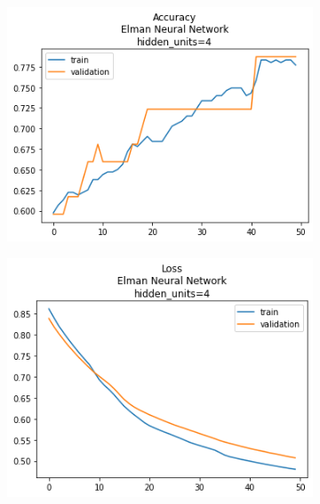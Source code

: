 \documentclass[12pt, a4paper]{article}
\begin{document}
\begin{figure}
    \centering
    \begin{subfigure}{0.45\linewidth}
        \includegraphics[width=0.9\linewidth]{images/q1/elman/acc_Elman Neural Networkhidden_units=4.png}
    \end{subfigure}
    \hfill
    \begin{subfigure}{0.45\linewidth}
        \includegraphics[width=0.9\linewidth]{images/q1/elman/loss_Elman Neural Networkhidden_units=4.png}
    \end{subfigure}
    \begin{subfigure}{0.45\linewidth}

\end{subfigure}
\end{figure}
\end{document}
